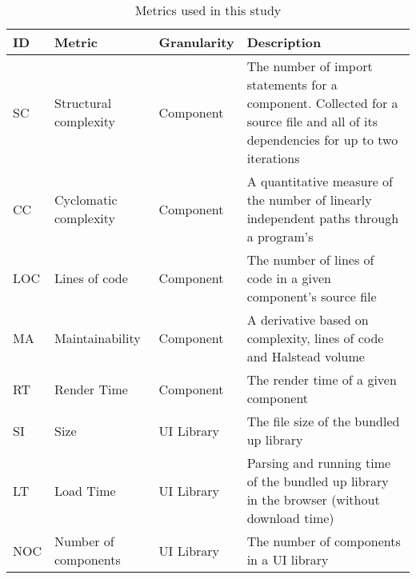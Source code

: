 \begin{table}[h]
	\begin{tabularx}{\columnwidth}{l|l|l|X}
		\toprule
		\textbf{ID} & \textbf{Metric}       & \textbf{Granularity} & \textbf{Description}                                                                                                              \\ \midrule
		SC          & Structural complexity & Component            & The number of import statements for a component. Collected for a source file and all of its dependencies for up to two iterations \\ \hline
		CC          & Cyclomatic complexity & Component            & A quantitative measure of the number of linearly independent paths through a program's~\cite{1702388}                             \\ \hline
		LOC         & Lines of code         & Component            & The number of lines of code in a given component's source file                                                                    \\ \hline
		MA          & Maintainability       & Component            & A derivative based on complexity, lines of code and Halstead volume~\cite{halstead1977elements}                                   \\ \hline
		RT          & Render Time           & Component            & The render time of a given component                                                                                              \\ \hline
		SI          & Size                  & UI Library           & The file size of the bundled up library                                                                                           \\ \hline
		LT          & Load Time             & UI Library           & Parsing and running time of the bundled up library in the browser (without download time)                                         \\ \hline
		NOC         & Number of components  & UI Library           & The number of components in a UI library                                                                                          \\
	\end{tabularx}
	\caption{Metrics used in this study}
	\label{tab:design:metrics}
\end{table}

